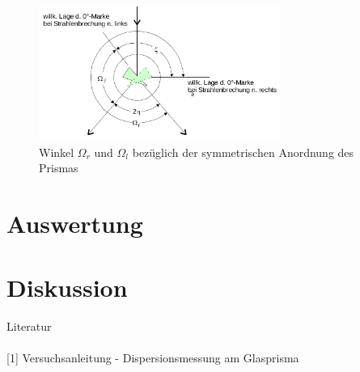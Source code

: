 \begin{figure}[H]
\includegraphics[width=0.7\textwidth]{pics/prisma_ohm1.png}
\caption{Winkel $\Omega_r$ und $\Omega_l$ bezüglich der symmetrischen Anordnung des Prismas}
\label{pic:prisma_ohmlr}
\end{figure}
	 

\section{Auswertung}

\section{Diskussion}




\parskip 50pt
\Large{Literatur}\\\\
\large{[1] Versuchsanleitung - Dispersionsmessung am Glasprisma}\\\\

